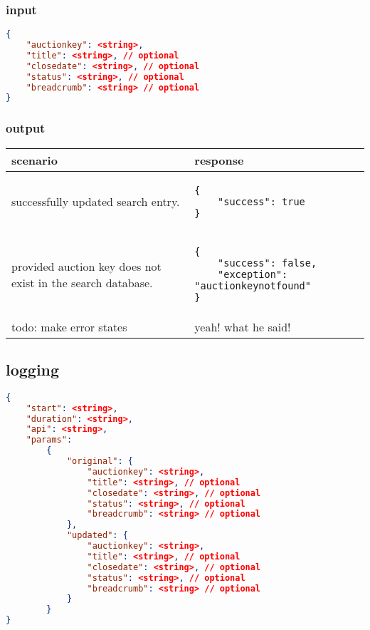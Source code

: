 \documentclass[12pt,a4paper]{article}
\begin{document}
\subsubsection{input}
\begin{lstlisting}[language=json,firstnumber=1]
{
    "auctionkey": <string>,
    "title": <string>, // optional
    "closedate": <string>, // optional
    "status": <string>, // optional
    "breadcrumb": <string> // optional
}
\end{lstlisting}

\subsubsection{output}
\begin{center}
    \begin{tabular}{| p{5cm} | l |}
        \hline
        \textbf{scenario} & \textbf{response} \\
        \hline
        successfully updated search entry. &
        \begin{lstlisting}[boxpos=t,language=tablejson,firstnumber=1]
{
    "success": true
}
        \end{lstlisting} \\ 
        \hline
        provided auction key does not exist in the search database. & 
        \begin{lstlisting}[boxpos=t,language=tablejson,firstnumber=1]
{
    "success": false,
    "exception": "auctionkeynotfound"
}
        \end{lstlisting} \\
        \hline
            todo: make error states & yeah! what he said! \\
        \hline
    \end{tabular}
\end{center}

\subsection{logging}

\begin{lstlisting}[boxpos=t,language=json,firstnumber=1]
{
    "start": <string>,
    "duration": <string>,
    "api": <string>,
    "params":
        {
            "original": {
                "auctionkey": <string>,
                "title": <string>, // optional
                "closedate": <string>, // optional
                "status": <string>, // optional
                "breadcrumb": <string> // optional 
            }, 
            "updated": {
                "auctionkey": <string>,
                "title": <string>, // optional
                "closedate": <string>, // optional
                "status": <string>, // optional
                "breadcrumb": <string> // optional 
            }
        }
}           
\end{lstlisting}
\end{document}
